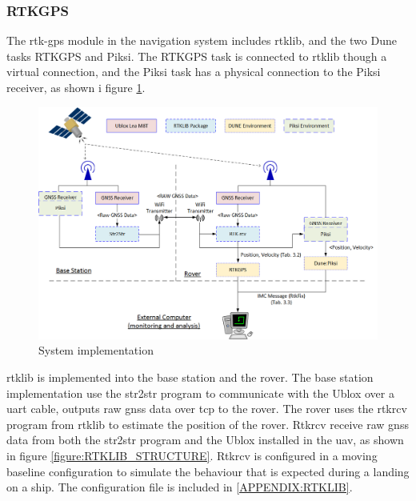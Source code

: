 \subsubsection{RTKGPS}
The \gls{rtk-gps} module in the navigation system includes \gls{rtklib}, and the two Dune tasks RTKGPS and Piksi. The RTKGPS task is connected to \gls{rtklib} though a virtual connection, and the Piksi task has a physical connection to the Piksi receiver, as shown i figure \ref{figure:HardSoft}.
\begin{figure}[H]
	\centering
		\includegraphics[width=1\textwidth]{figs/Combined.png}
		\caption{System implementation}
		\label{figure:HardSoft}
\end{figure}

\gls{rtklib} is implemented into the base station and the rover. The base station implementation use the  str2str program to communicate with the Ublox over a uart cable, outputs raw \gls{gnss} data over tcp to the rover.
The rover uses the rtkrcv program from \gls{rtklib} to estimate the position of the rover. Rtkrcv receive raw \gls{gnss} data from both the str2str program and the Ublox installed in the \gls{uav}, as shown in figure \ref{figure:RTKLIB_STRUCTURE}. Rtkrcv is configured in a moving baseline configuration to simulate the behaviour that is expected during a landing on a ship. The configuration file is included in \ref{APPENDIX:RTKLIB}.

